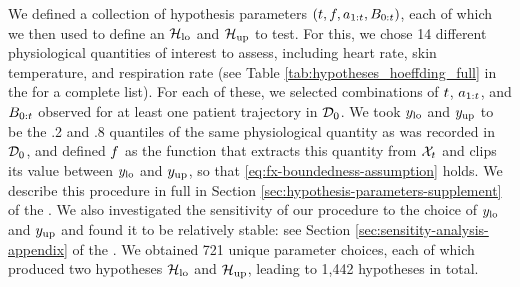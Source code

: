

We defined a collection of hypothesis parameters $(t, f, a_{1:t}, B_{0:t})$, each of which we then used to define an $\mathcal{H}_{\mathrm{lo}}$ and $\mathcal{H}_{\mathrm{up}}$ to test.
For this, we chose 14 different physiological quantities of interest to assess, including heart rate, skin temperature, and respiration rate (see Table \ref{tab:hypotheses_hoeffding_full} in the \AppendixName for a complete list).
For each of these, we selected combinations of $t$, $a_{1:t}$, and $B_{0:t}$ observed for at least one patient trajectory in $\mathcal{D}_0$.
We took \(y_{\mathrm{lo}}\) and \(y_{\mathrm{up}}\) to be the .2 and .8 quantiles of the same physiological quantity as was recorded in $\mathcal{D}_0$, and defined $f$ as the function that extracts this quantity from \(\mathcal{X}_t\) and clips its value between \(y_{\mathrm{lo}}\) and \(y_{\mathrm{up}}\), so that \eqref{eq:fx-boundedness-assumption} holds.
We describe this procedure in full in Section \ref{sec:hypothesis-parameters-supplement} of the \AppendixName.
We also investigated the sensitivity of our procedure to the choice of $y_{\mathrm{lo}}$ and $y_{\mathrm{up}}$ and found it to be relatively stable: see Section \ref{sec:sensitity-analysis-appendix} of the \AppendixName.
We obtained 721 unique parameter choices, each of which produced two hypotheses $\mathcal{H}_{\mathrm{lo}}$ and $\mathcal{H}_{\mathrm{up}}$, leading to 1,442 hypotheses in total.

